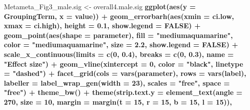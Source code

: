 \documentclass[]{article}
\newenvironment{Shaded}{\begin{snugshade}}{\end{snugshade}}
\newcommand{\DataTypeTok}[1]{\textcolor[rgb]{0.13,0.29,0.53}{#1}}
\newcommand{\DecValTok}[1]{\textcolor[rgb]{0.00,0.00,0.81}{#1}}
\newcommand{\FloatTok}[1]{\textcolor[rgb]{0.00,0.00,0.81}{#1}}
\newcommand{\KeywordTok}[1]{\textcolor[rgb]{0.13,0.29,0.53}{\textbf{#1}}}
\newcommand{\NormalTok}[1]{#1}
\newcommand{\OperatorTok}[1]{\textcolor[rgb]{0.81,0.36,0.00}{\textbf{#1}}}
\newcommand{\OtherTok}[1]{\textcolor[rgb]{0.56,0.35,0.01}{#1}}
\newcommand{\StringTok}[1]{\textcolor[rgb]{0.31,0.60,0.02}{#1}}
\begin{document}
\begin{Shaded}
\begin{Highlighting}[]
{{{{{{{{{{{{{{{{{{{{{{{{{{{{{{{{{{{{{{{{{{{{{{{{{\NormalTok{Metameta_Fig3_male.sig <-}\StringTok{ }\NormalTok{overall4.male.sig }\OperatorTok{%>%}
\StringTok{  }\KeywordTok{ggplot}\NormalTok{(}\KeywordTok{aes}\NormalTok{(}\DataTypeTok{y =}\NormalTok{ GroupingTerm, }\DataTypeTok{x =}\NormalTok{ value)) }\OperatorTok{+}
\StringTok{  }\KeywordTok{geom_errorbarh}\NormalTok{(}\KeywordTok{aes}\NormalTok{(}\DataTypeTok{xmin =}\NormalTok{ ci.low,}
                     \DataTypeTok{xmax =}\NormalTok{ ci.high),}
                 \DataTypeTok{height =} \FloatTok{0.1}\NormalTok{, }
                 \DataTypeTok{show.legend =} \OtherTok{FALSE}\NormalTok{) }\OperatorTok{+}
\StringTok{  }\KeywordTok{geom_point}\NormalTok{(}\KeywordTok{aes}\NormalTok{(}\DataTypeTok{shape =}\NormalTok{ parameter),}
             \DataTypeTok{fill =} \StringTok{"mediumaquamarine"}\NormalTok{, }
             \DataTypeTok{color =} \StringTok{"mediumaquamarine"}\NormalTok{, }
             \DataTypeTok{size =} \FloatTok{2.2}\NormalTok{, }
             \DataTypeTok{show.legend =} \OtherTok{FALSE}\NormalTok{) }\OperatorTok{+}
\StringTok{  }\KeywordTok{scale_x_continuous}\NormalTok{(}\DataTypeTok{limits =} \KeywordTok{c}\NormalTok{(}\DecValTok{0}\NormalTok{, }\FloatTok{0.4}\NormalTok{),}
                     \DataTypeTok{breaks =} \KeywordTok{c}\NormalTok{(}\DecValTok{0}\NormalTok{, }\FloatTok{0.3}\NormalTok{),}
                       \DataTypeTok{name =} \StringTok{"Effect size"}\NormalTok{) }\OperatorTok{+}
\StringTok{  }\KeywordTok{geom_vline}\NormalTok{(}\DataTypeTok{xintercept =} \DecValTok{0}\NormalTok{,}
                  \DataTypeTok{color =} \StringTok{"black"}\NormalTok{,}
              \DataTypeTok{linetype =} \StringTok{"dashed"}\NormalTok{) }\OperatorTok{+}
\StringTok{  }\KeywordTok{facet_grid}\NormalTok{(}\DataTypeTok{cols =} \KeywordTok{vars}\NormalTok{(parameter), }
             \DataTypeTok{rows =} \KeywordTok{vars}\NormalTok{(label),}
             \DataTypeTok{labeller =} \KeywordTok{label_wrap_gen}\NormalTok{(}\DataTypeTok{width =} \DecValTok{23}\NormalTok{),}
             \DataTypeTok{scales =} \StringTok{"free"}\NormalTok{,}
             \DataTypeTok{space =} \StringTok{"free"}\NormalTok{) }\OperatorTok{+}
\StringTok{  }\KeywordTok{theme_bw}\NormalTok{() }\OperatorTok{+}
\StringTok{  }\KeywordTok{theme}\NormalTok{(}\DataTypeTok{strip.text.y =} \KeywordTok{element_text}\NormalTok{(}\DataTypeTok{angle =} \DecValTok{270}\NormalTok{, }
                                    \DataTypeTok{size =} \DecValTok{10}\NormalTok{, }
                                    \DataTypeTok{margin =} \KeywordTok{margin}\NormalTok{(}\DataTypeTok{t =} \DecValTok{15}\NormalTok{, }\DataTypeTok{r =} \DecValTok{15}\NormalTok{, }\DataTypeTok{b =} \DecValTok{15}\NormalTok{, }\DataTypeTok{l =} \DecValTok{15}\NormalTok{)),}
}}}}}}}}}}}}}}}}}}}}}}}}}}}}}}}}}}}}}}}}}}}}}}}}}}
\end{Highlighting}
\end{Shaded}
\end{document}
